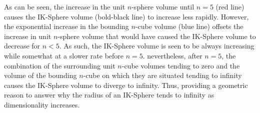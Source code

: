 As can be seen, the increase in the unit $n$-sphere volume until $n=5$ (red line) causes the IK-Sphere volume (bold-black line) to increase less rapidly. However, the exponential increase in the bounding $n$-cube volume (blue line) offsets the increase in unit $n$-sphere volume that would have caused the IK-Sphere volume to decrease for $n<5$. As such, the IK-Sphere volume is seen to be always increasing while somewhat at a slower rate before $n=5$. nevertheless, after $n=5$, the combination of the surrounding unit $n$-cube volumes tending to zero and the volume of the bounding $n$-cube on which they are situated tending to infinity causes the IK-Sphere volume to diverge to infinity. Thus, providing a geometric reason to answer why the radius of an IK-Sphere tends to infinity as dimensionality increases.
